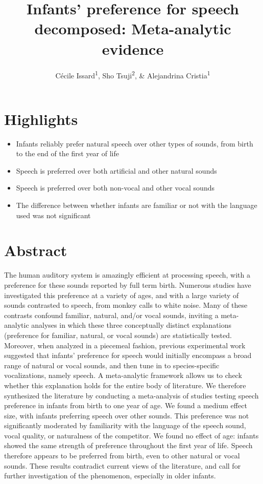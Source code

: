 \documentclass[man]{apa6}
\affiliation{
\vspace{0.5cm}
\textsuperscript{1} Laboratoire de Sciences Cognitives et Psycholinguistique, Ecole Normale Supérieure, Département d'Études Cognitives\\\textsuperscript{2} International Research Center for Neurointelligence, The University of Tokyo}
\title{Infants' preference for speech decomposed: Meta-analytic evidence}
\author{Cécile Issard\textsuperscript{1}, Sho Tsuji\textsuperscript{2}, \& Alejandrina Cristia\textsuperscript{1}}
\date{}
\providecommand{\tightlist}{%
  \setlength{\itemsep}{0pt}\setlength{\parskip}{0pt}}
\begin{document}
\maketitle

\hypertarget{highlights}{%
\section{Highlights}\label{highlights}}

\begin{itemize}
\tightlist
\item
  Infants reliably prefer natural speech over other types of sounds, from birth to the end of the first year of life
\item
  Speech is preferred over both artificial and other natural sounds
\item
  Speech is preferred over both non-vocal and other vocal sounds
\item
  The difference between whether infants are familiar or not with the language used was not significant
\end{itemize}

\hypertarget{abstract}{%
\section{Abstract}\label{abstract}}

The human auditory system is amazingly efficient at processing speech, with a preference for these sounds reported by full term birth. Numerous studies have investigated this preference at a variety of ages, and with a large variety of sounds contrasted to speech, from monkey calls to white noise. Many of these contrasts confound familiar, natural, and/or vocal sounds, inviting a meta-analytic analyses in which these three conceptually distinct explanations (preference for familiar, natural, or vocal sounds) are statistically tested. Moreover, when analyzed in a piecemeal fashion, previous experimental work suggested that infants' preference for speech would initially encompass a broad range of natural or vocal sounds, and then tune in to species-specific vocalizations, namely speech. A meta-analytic framework allows us to check whether this explanation holds for the entire body of literature. We therefore synthesized the literature by conducting a meta-analysis of studies testing speech preference in infants from birth to one year of age. We found a medium effect size, with infants preferring speech over other sounds. This preference was not significantly moderated by familiarity with the language of the speech sound, vocal quality, or naturalness of the competitor. We found no effect of age: infants showed the same strength of preference throughout the first year of life. Speech therefore appears to be preferred from birth, even to other natural or vocal sounds. These results contradict current views of the literature, and call for further investigation of the phenomenon, especially in older infants.
\end{document}
